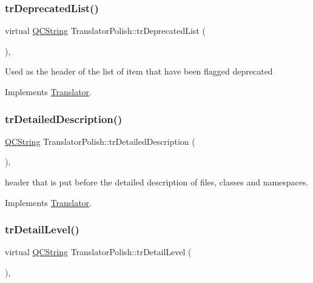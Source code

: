 \subsubsection{\texorpdfstring{trDeprecatedList()}{trDeprecatedList()}}
{\footnotesize\ttfamily virtual \mbox{\hyperlink{class_q_c_string}{Q\+C\+String}} Translator\+Polish\+::tr\+Deprecated\+List (\begin{DoxyParamCaption}{ }\end{DoxyParamCaption})\hspace{0.3cm}{\ttfamily [inline]}, {\ttfamily [virtual]}}

Used as the header of the list of item that have been flagged deprecated 

Implements \mbox{\hyperlink{class_translator}{Translator}}.

\mbox{\label{class_translator_polish_a2d0e5f23e20962482c7750b64af25e52}} 
\subsubsection{\texorpdfstring{trDetailedDescription()}{trDetailedDescription()}}
{\footnotesize\ttfamily \mbox{\hyperlink{class_q_c_string}{Q\+C\+String}} Translator\+Polish\+::tr\+Detailed\+Description (\begin{DoxyParamCaption}{ }\end{DoxyParamCaption})\hspace{0.3cm}{\ttfamily [inline]}, {\ttfamily [virtual]}}

header that is put before the detailed description of files, classes and namespaces. 

Implements \mbox{\hyperlink{class_translator}{Translator}}.

\mbox{\label{class_translator_polish_a68865adf71b369f41766250b65e9fbf3}} 
\subsubsection{\texorpdfstring{trDetailLevel()}{trDetailLevel()}}
{\footnotesize\ttfamily virtual \mbox{\hyperlink{class_q_c_string}{Q\+C\+String}} Translator\+Polish\+::tr\+Detail\+Level (\begin{DoxyParamCaption}{ }\end{DoxyParamCaption})\hspace{0.3cm}{\ttfamily [inline]}, {\ttfamily [virtual]}}

